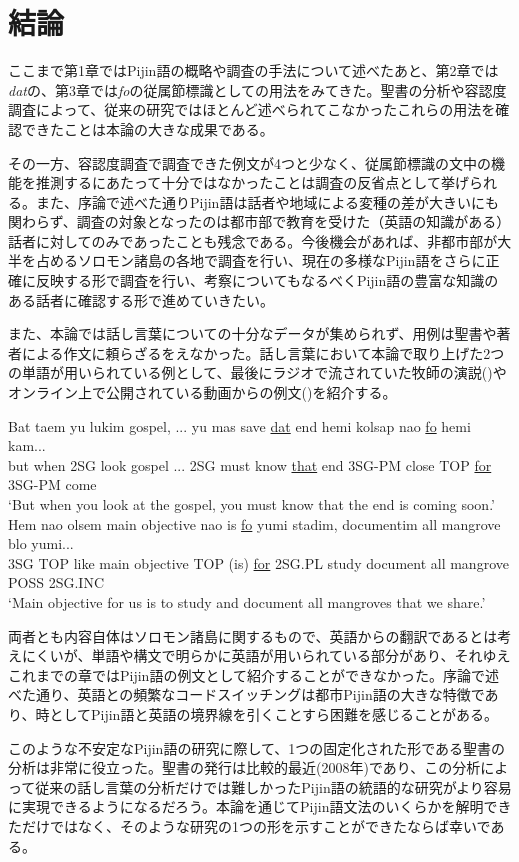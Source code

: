 \chapter{結論}
ここまで第1章ではPijin語の概略や調査の手法について述べたあと、第2章では\textit{dat}の、第3章では\textit{fo}の従属節標識としての用法をみてきた。聖書の分析や容認度調査によって、従来の研究ではほとんど述べられてこなかったこれらの用法を確認できたことは本論の大きな成果である。

その一方、容認度調査で調査できた例文が4つと少なく、従属節標識の文中の機能を推測するにあたって十分ではなかったことは調査の反省点として挙げられる。また、序論で述べた通りPijin語は話者や地域による変種の差が大きいにも関わらず、調査の対象となったのは都市部で教育を受けた（英語の知識がある）話者に対してのみであったことも残念である。今後機会があれば、非都市部が大半を占めるソロモン諸島の各地で調査を行い、現在の多様なPijin語をさらに正確に反映する形で調査を行い、考察についてもなるべくPijin語の豊富な知識のある話者に確認する形で進めていきたい。

また、本論では話し言葉についての十分なデータが集められず、用例は聖書や著者による作文に頼らざるをえなかった。話し言葉において本論で取り上げた2つの単語が用いられている例として、最後にラジオで流されていた牧師の演説()やオンライン上で公開されている動画からの例文()を紹介する。

\begin{exe}
\ex\label{bokushi}
\gll Bat taem yu lukim gospel, ... yu mas save \underline{dat} end hemi kolsap nao \underline{fo} hemi kam...\\
but when 2SG look gospel ... 2SG must know \underline{that} end 3SG-PM close TOP \underline{for} 3SG-PM come\\
\glt `But when you look at the gospel, you must know that the end is coming soon.'
\ex\label{manguru1}
\gll Hem nao olsem main objective nao is \underline{fo} yumi stadim, documentim all mangrove blo yumi...\\
3SG TOP like main objective TOP (is) \underline{for} 2SG.PL study document all mangrove POSS 2SG.INC\\
\glt `Main objective for us is to study and document all mangroves that we share.'\citep[20分4秒]{manguru}
\end{exe}

両者とも内容自体はソロモン諸島に関するもので、英語からの翻訳であるとは考えにくいが、単語や構文で明らかに英語が用いられている部分があり、それゆえこれまでの章ではPijin語の例文として紹介することができなかった。序論で述べた通り、英語との頻繁なコードスイッチングは都市Pijin語の大きな特徴であり、時としてPijin語と英語の境界線を引くことすら困難を感じることがある。

このような不安定なPijin語の研究に際して、1つの固定化された形である聖書の分析は非常に役立った。聖書の発行は比較的最近(2008年)であり、この分析によって従来の話し言葉の分析だけでは難しかったPijin語の統語的な研究がより容易に実現できるようになるだろう。本論を通じてPijin語文法のいくらかを解明できただけではなく、そのような研究の1つの形を示すことができたならば幸いである。
